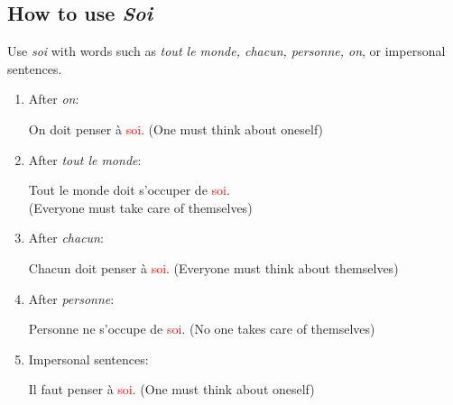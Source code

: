 \documentclass{book}
\begin{document}
        \subsection{How to use \textit{Soi}}
            Use \textit{soi} with words such as \textit{tout le monde, chacun, personne, on}, or impersonal sentences.
            \begin{enumerate}
                \item After \textit{on}:
                    \begin{center}
                        On doit penser à \textcolor{red}{soi}. \quad (One must think about oneself)
                    \end{center}
                \item After \textit{tout le monde}:
                    \begin{center}
                        Tout le monde doit s'occuper de \textcolor{red}{soi}. \\ 
                        (Everyone must take care of themselves)
                    \end{center}
                \item After \textit{chacun}:
                    \begin{center}
                        Chacun doit penser à \textcolor{red}{soi}. \quad (Everyone must think about themselves)
                    \end{center}
                \item After \textit{personne}:
                    \begin{center}
                        Personne ne s'occupe de \textcolor{red}{soi}. \quad (No one takes care of themselves)
                    \end{center}
                \item Impersonal sentences:
                    \begin{center}
                        Il faut penser à \textcolor{red}{soi}. \quad (One must think about oneself)
                    \end{center}
            \end{enumerate}
        
\end{document}
